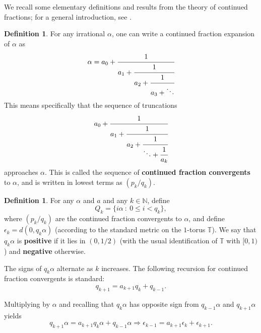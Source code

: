 \documentclass[11pt,reqno]{amsart}
\theoremstyle{definition}
\newtheorem{definition}[theorem]{Definition}
\theoremstyle{plain}
\newcommand{\R}{\mathbb{R}}
\newcommand{\T}{\mathbb{T}}
\begin{document}
We recall some elementary definitions and results from the theory of continued fractions; for a general introduction, see \cite{hardywright}.

\begin{definition}
For any irrational $\alpha$, one can write a continued fraction expansion of $\alpha$ as
\[
\alpha = a_0 + \cfrac{1}{a_1 + \cfrac{1}{a_2 + \cfrac{1}{a_3 + \ddots}}}
\]
This means specifically that the sequence of truncations 
\[
a_0 + \cfrac{1}{a_1 + \cfrac{1}{a_2 + \cfrac{1}{\ddots + \cfrac{1}{a_k}}}}
\]
approaches $\alpha$. This is called the sequence of \textbf{continued fraction convergents} to $\alpha$, and is written in lowest terms as $(p_k/q_k)$.
\end{definition}

\begin{definition}
For any $\alpha$ and $a$ and any $k \in \mathbb{N}$, define 
\[
Q_k = \{i\alpha \ : \ 0 \leq i < q_k\}, 
\]
where $(p_k/q_k)$ are the continued fraction convergents to $\alpha$, and define $\epsilon_k = d(0, q_k \alpha)$
(according to the standard metric on the $1$-torus $\mathbb{T}$).
We say that $q_k \alpha$ is \textbf{positive} if it lies in $(0, 1/2)$ (with the usual identification of $\mathbb{T}$ with $[0,1)$) and \textbf{negative} otherwise. %
\end{definition}

The signs of $q_k \alpha$ alternate as $k$ increases. The following recursion for continued fraction convergents is standard:
\[
q_{k+1} = a_{k+1} q_k + q_{k-1}.
\]

Multiplying by $\alpha$ and recalling that $q_{k} \alpha$ has opposite sign from $q_{k-1} \alpha$ and $q_{k+1} \alpha$ yields
\[
q_{k+1} \alpha = a_{k+1} q_k \alpha + q_{k-1} \alpha \Longrightarrow \epsilon_{k-1} = a_{k+1} \epsilon_k + \epsilon_{k+1}.
\]
\end{document}
